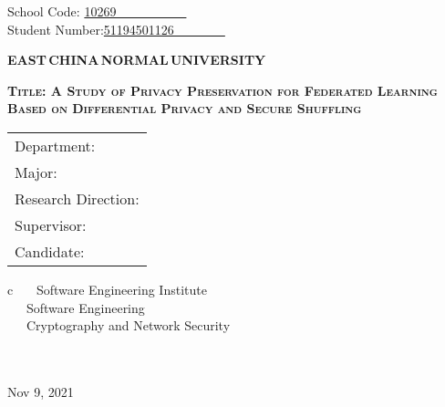 \newpage

\pagestyle{empty}

\hskip 1.4cm {School Code: \underline{10269~~~~~~~~~~~\qquad}}\\
\hspace*{\fill} {Student Number:\underline{51194501126~~~~~~~~}}
\vskip 2cm

\begin{center}
{\Huge \bf EAST\,CHINA\,NORMAL\,UNIVERSITY}
\end{center}

\vskip 3cm

\begin{center}
{\huge \bf \scshape Title: A Study of Privacy Preservation for Federated Learning Based on Differential Privacy and Secure Shuffling}
\end{center}

\vskip 2cm {\large
\begin{center}
\begin{tabular}{l}
Department:\\
Major:\\
Research Direction:\\
Supervisor:\\
Candidate:
\end{tabular}
\begin{tabular}c
~~~Software Engineering Institute\\
\hline ~~~Software Engineering  \\
\hline ~~~Cryptography and Network Security\\
\hline ~~~  \\%
\hline ~~~  \\%
\hline
\end{tabular}
\end{center}}

\vskip 30mm

\begin{center}
{\Large Nov 9, 2021}
\end{center}
